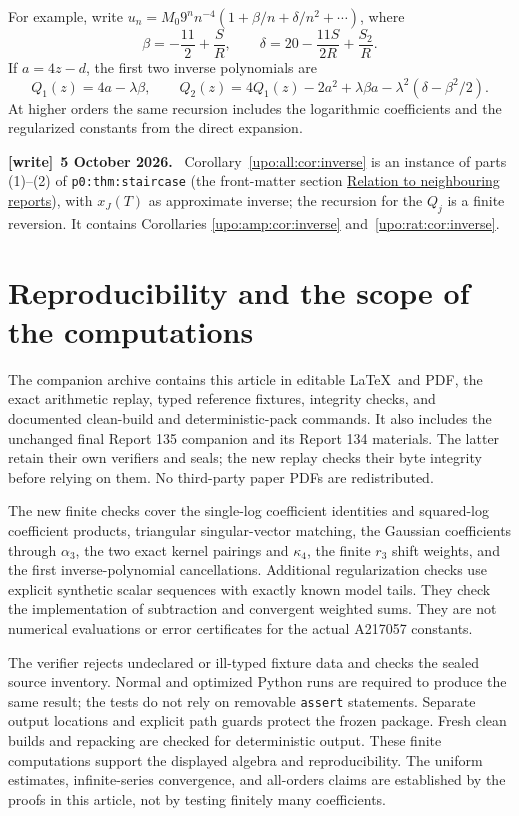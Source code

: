\documentclass[11pt,letterpaper]{article}
\theoremstyle{remark}\newtheorem{remark}[theorem]{Remark}
\numberwithin{equation}{section}
\newenvironment{writenote}[1][]{\par\smallskip\begingroup\small
 \noindent\textbf{[write]}\if\relax\detokenize{#1}\relax\else~\textbf{#1.}\fi\ }%
 {\par\endgroup\smallskip}
\begin{document}
For example, write
$u_n=M_0 9^n n^{-4}(1+\beta/n+\delta/n^2+\cdots)$, where
\[
\beta=-\frac{11}{2}+\frac SR,
\qquad \delta=20-\frac{11S}{2R}+\frac{S_2}{R}.
\]
If
$a=4z-d$, the first two inverse polynomials are
\[
Q_1(z)=4a-\lambda\beta,
\qquad Q_2(z)=4Q_1(z)-2a^2+\lambda\beta a
 -\lambda^2(\delta-\beta^2/2).
\]
At higher orders the same recursion includes the logarithmic
coefficients and the regularized constants from the direct expansion.
\begin{writenote}[5 October 2026]
Corollary~\ref{upo:all:cor:inverse} is an instance of parts (1)--(2) of \texttt{p0:thm:staircase} (the front-matter section \hyperref[upo:sec:neighbours]{Relation to neighbouring reports}), with $x_J(T)$ as approximate inverse; the recursion for the $Q_j$ is a finite reversion. It contains Corollaries \ref{upo:amp:cor:inverse} and~\ref{upo:rat:cor:inverse}.
\end{writenote}

\section{Reproducibility and the scope of the computations}\label{upo:all:sec:repro}
The companion archive contains this article in editable \LaTeX\ and
PDF, the exact arithmetic replay, typed reference fixtures, integrity
checks, and documented clean-build and deterministic-pack commands.
It also includes the unchanged final Report 135 companion and its
Report 134 materials. The latter retain their own verifiers and seals;
the new replay checks their byte integrity before relying on them.
No third-party paper PDFs are redistributed.

The new finite checks cover the single-log coefficient identities and
squared-log coefficient products, triangular singular-vector matching,
the Gaussian coefficients through $\alpha_3$, the two exact kernel
pairings and $\kappa_4$, the finite $r_3$ shift weights, and the first
inverse-polynomial cancellations. Additional regularization checks use
explicit synthetic scalar sequences with exactly known model tails.
They check the implementation of subtraction and convergent weighted
sums. They are not numerical evaluations or error certificates for the
actual A217057 constants.

The verifier rejects undeclared or ill-typed fixture data and checks the
sealed source inventory. Normal and optimized Python runs are required
to produce the same result; the tests do not rely on removable
\texttt{assert} statements. Separate output locations and explicit
path guards protect the frozen package. Fresh clean builds and
repacking are checked for deterministic output. These finite
computations support the displayed algebra and reproducibility.
The uniform estimates, infinite-series convergence, and all-orders
claims are established by the proofs in this article, not by testing
finitely many coefficients.
\end{document}
